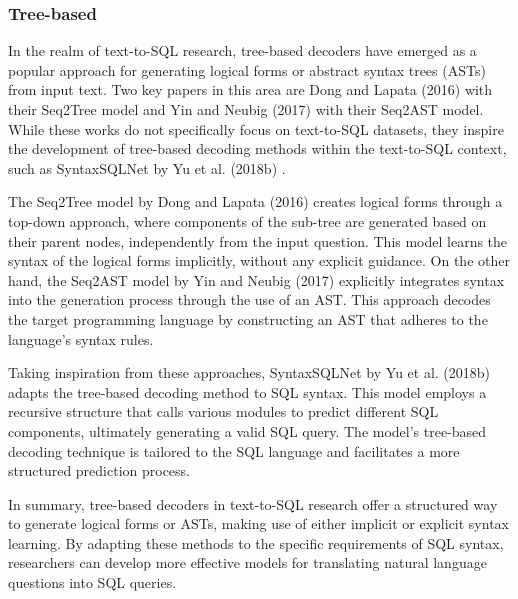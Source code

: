 \subsubsection{Tree-based}

In the realm of text-to-SQL research, tree-based decoders have emerged as a popular approach for generating logical forms or abstract syntax trees (ASTs) from input text. Two key papers in this area are Dong and Lapata (2016) \cite{dong-lapata-2016-language} with their Seq2Tree model and Yin and Neubig (2017) \cite{yin-neubig-2017-syntactic} with their Seq2AST model. While these works do not specifically focus on text-to-SQL datasets, they inspire the development of tree-based decoding methods within the text-to-SQL context, such as SyntaxSQLNet by Yu et al. (2018b) \cite{DBLP:journals/corr/abs-1810-05237}.

The Seq2Tree model by Dong and Lapata (2016) \cite{dong-lapata-2016-language} creates logical forms through a top-down approach, where components of the sub-tree are generated based on their parent nodes, independently from the input question. This model learns the syntax of the logical forms implicitly, without any explicit guidance. On the other hand, the Seq2AST model by Yin and Neubig (2017)  \cite{yin-neubig-2017-syntactic} explicitly integrates syntax into the generation process through the use of an AST. This approach decodes the target programming language by constructing an AST that adheres to the language's syntax rules.

Taking inspiration from these approaches, SyntaxSQLNet by Yu et al. (2018b) \cite{DBLP:journals/corr/abs-1810-05237} adapts the tree-based decoding method to SQL syntax. This model employs a recursive structure that calls various modules to predict different SQL components, ultimately generating a valid SQL query. The model's tree-based decoding technique is tailored to the SQL language and facilitates a more structured prediction process.

In summary, tree-based decoders in text-to-SQL research offer a structured way to generate logical forms or ASTs, making use of either implicit or explicit syntax learning. By adapting these methods to the specific requirements of SQL syntax, researchers can develop more effective models for translating natural language questions into SQL queries.